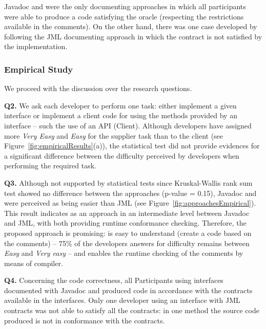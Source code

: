 Javadoc and \contractjdoc{} were the only documenting approaches in
which all participants were able to produce a code satisfying the oracle
(respecting the restrictions available in the comments). On the other hand,
there was one case developed by following the JML documenting approach in which
the contract is not satisfied by the implementation.

\subsubsection{Empirical Study}
\label{sec:expDiscussion}

We proceed with the discussion over the research questions.

\textbf{Q2.} We ask each developer to perform one task:
either implement a given interface or implement a client code for using the
methods provided by an interface -- such the use of an API (Client). 
Although developers have assigned more \emph{Very Easy} and \textit{Easy} for
the supplier task than to the client (see Figure~\ref{fig:empiricalResults}(a)),
the statistical test did not provide evidences for a significant difference
between the difficulty perceived by developers when performing the required
task.


\textbf{Q3.}  Although not supported by statistical tests since Kruskal-Wallis
rank sum test showed no difference between the approaches (p-value = 0.15), Javadoc and
\contractjdoc{} were perceived as being easier than JML (see Figure~\ref{fig:approachesEmpirical}).
This result indicates \contractjdoc{} as an approach in an intermediate level
between Javadoc and JML, with both providing runtime conformance checking. Therefore, the
proposed approach is promising: \contractjdoc{} is easy to understand
(create a code based on the comments) -- 75\% of the developers answers for
difficulty remains between \textit{Easy} and \textit{Very easy} -- and enables
the runtime checking of the comments by means of \contractjdocCompiler{}
compiler.

\textbf{Q4.} Concerning the code correctness, all Participants using
interfaces documented with Javadoc and \contractjdoc{} produced code
in accordance with the contracts available in the interfaces. Only one
developer using an interface with JML contracts was not able to
satisfy all the contracts: in one method the source code produced is not in
conformance with the contracts. 

